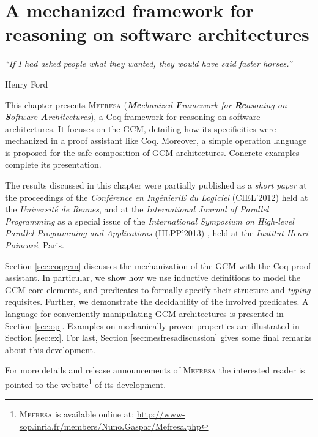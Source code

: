 \chapter{A mechanized framework for reasoning on software architectures}
\label{chap:mefresa} 
\epigraph{\textit{“If I had asked people what they wanted, they would have said faster horses.”}}{Henry Ford}
	
\minitoc

	
This chapter presents \textsc{Mefresa} (\textit{\textbf{Me}chanized \textbf{F}ramework for \textbf{Re}asoning on \textbf{S}oftware \textbf{A}rchitectures}), a Coq framework for reasoning on software architectures.
	It focuses on the \ac{GCM}, detailing how its specificities were mechanized in a proof assistant like Coq. 
	Moreover, a simple \textsf{operation} language is proposed for the safe composition of 
	\ac{GCM} architectures. Concrete examples complete its presentation.
		
	The results discussed in this chapter were partially published as a \textit{short paper} at the proceedings
	of the \textit{Conf\'erence en Ing\'enieriE du Logiciel} (CIEL'2012) \cite{gaspar:hal-00725291} held
	at the \textit{Universit\'e de Rennes},
	and at the \textit{International Journal of Parallel Programming} as a special issue
	of the \textit{International Symposium on High-level Parallel Programming and Applications} (HLPP'2013) \cite{GASHENMAD:IJPP13},
	held at the \textit{Institut Henri Poincar\'e}, Paris.	
	
	Section \ref{sec:coqgcm} discusses the mechanization of the \ac{GCM} with the Coq
	proof assistant. In particular, we show how we use inductive definitions to model
	the \ac{GCM} core elements, and predicates to formally specify their structure
	and \textit{typing} requisites.  Further, we demonstrate the decidability
	of the involved predicates.	
	A language for conveniently manipulating \ac{GCM} architectures
	is presented in Section \ref{sec:op}. Examples on mechanically proven properties
	are illustrated in Section \ref{sec:ex}.	For last, Section \ref{sec:mesfresadiscussion} gives
	some final remarks about this development.
	 
		
	For more details and release announcements of \textsc{Mefresa} 
	the interested reader is pointed to the website\footnote{\textsc{Mefresa}  is available online at: 
	\url{http://www-sop.inria.fr/members/Nuno.Gaspar/Mefresa.php}} of its development. 
